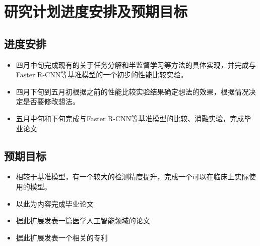 \section{研究计划进度安排及预期目标}

\subsection{进度安排}
\begin{itemize}
    \item 四月中旬完成现有的关于任务分解和半监督学习等方法的具体实现，并完成与Faster R-CNN等基准模型的一个初步的性能比较实验。
    \item 四月下旬到五月初根据之前的性能比较实验结果确定想法的效果，根据情况决定是否要修改想法。
    \item 五月中旬和下旬完成与Faster R-CNN等基准模型的比较、消融实验，完成毕业论文
\end{itemize}

\subsection{预期目标}
\begin{itemize}
    \item 相较于基准模型，有一个较大的检测精度提升，完成一个可以在临床上实际使用的模型。
    \item 以此为内容完成毕业论文
    \item 据此扩展发表一篇医学人工智能领域的论文
    \item 据此扩展发表一个相关的专利
\end{itemize}
